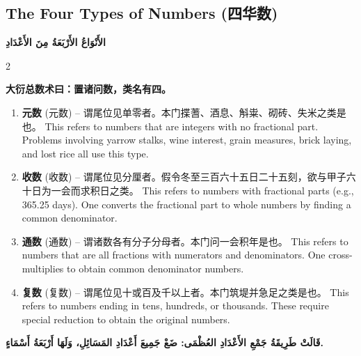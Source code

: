 \documentclass[11pt,a4paper]{article}
\newcommand{\ar}[1]{\arabicfont\beginR #1\endR}
\newcommand{\zhtext}[1]{{\chinese #1}}
\newenvironment{bilingual}{%
  \begin{paracol}{2}
}{%
  \end{paracol}
}
\begin{document}
\vspace{1em}

\subsection{The Four Types of Numbers (\zhtext{四华数})}
\ar{\textbf{الأَنْوَاعُ الأَرْبَعَةُ مِنَ الأَعْدَادِ}}

\begin{bilingual}

\begin{leftcolumn*}
\textbf{\zhtext{大衍总数术曰：}置诸问数，类名有四。}

\begin{enumerate}[label=\arabic*.]
  \item \textbf{元数} (\zhtext{元数}) -- \zhtext{谓尾位见单零者。本门揲蓍、酒息、斛粜、砌砖、失米之类是也。} This refers to numbers that are integers with no fractional part. Problems involving yarrow stalks, wine interest, grain measures, brick laying, and lost rice all use this type.
  \item \textbf{收数} (\zhtext{收数}) -- \zhtext{谓尾位见分厘者。假令冬至三百六十五日二十五刻，欲与甲子六十日为一会而求积日之类。} This refers to numbers with fractional parts (e.g., 365.25 days). One converts the fractional part to whole numbers by finding a common denominator.
  \item \textbf{通数} (\zhtext{通数}) -- \zhtext{谓诸数各有分子分母者。本门问一会积年是也。} This refers to numbers that are all fractions with numerators and denominators. One cross-multiplies to obtain common denominator numbers.
  \item \textbf{复数} (\zhtext{复数}) -- \zhtext{谓尾位见十或百及千以上者。本门筑堤并急足之类是也。} This refers to numbers ending in tens, hundreds, or thousands. These require special reduction to obtain the original numbers.
\end{enumerate}
\end{leftcolumn*}

\begin{rightcolumn*}
\ar{\textbf{قَالَتْ طَرِيقَةُ جَمْعِ الأَعْدَادِ العُظْمَى: ضَعْ جَمِيعَ أَعْدَادِ المَسَائِلِ، وَلَهَا أَرْبَعَةُ أَسْمَاءٍ.}}


\end{rightcolumn*}
\end{bilingual}
\end{document}
